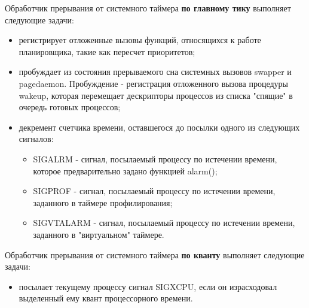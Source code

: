 Обработчик прерывания от системного таймера \textbf{по главному тику} выполняет следующие задачи:
\begin{itemize}
	\item регистрирует отложенные вызовы функций, относящихся к работе планировщика, такие как пересчет приоритетов;
	\item пробуждает из состояния прерываемого сна системных вызовов swapper и pagedaemon. Пробуждение - регистрация отложенного вызова процедуры wakeup, которая перемещает дескрипторы процессов из списка "спящие" в очередь готовых процессов;
	\item декремент счетчика времени, оставшегося до посылки одного из следующих сигналов:
	\begin{itemize}
		\item SIGALRM - сигнал, посылаемый процессу по истечении времени, которое предварительно задано функцией alarm();
		\item SIGPROF - сигнал, посылаемый процессу по истечении времени, заданного в таймере профилирования;
		\item SIGVTALARM - сигнал, посылаемый процессу по истечении времени, заданного в "виртуальном" таймере.
	\end{itemize}
\end{itemize}

Обработчик прерывания от системного таймера \textbf{по кванту} выполняет следующие задачи:
\begin{itemize}
	\item посылает текущему процессу сигнал SIGXCPU, если он израсходовал выделенный ему квант процессорного времени.
\end{itemize}